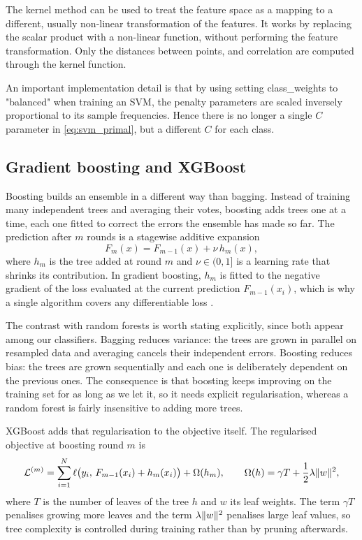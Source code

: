 The kernel method can be used to treat the feature space as a mapping to a different, usually non-linear transformation of the features. It works by replacing the scalar product with a non-linear function, without performing the feature transformation. Only the distances between points, and correlation are computed through the kernel function.

An important implementation detail is that by using setting class\_weights to "balanced" when training an SVM, the penalty parameters are scaled inversely proportional to its sample frequencies. Hence there is no longer a single $C$ parameter in \eqref{eq:svm_primal}, but a different $C$ for each class.

\subsection*{Gradient boosting and XGBoost}

Boosting builds an ensemble in a different way than bagging. Instead of training many
independent trees and averaging their votes, boosting adds trees one at a time, each one
fitted to correct the errors the ensemble has made so far. The prediction after $m$ rounds is
a stagewise additive expansion
\begin{equation}
F_m(x) = F_{m-1}(x) + \nu \, h_m(x),
\label{eq:boosting_additive}
\end{equation}
where $h_m$ is the tree added at round $m$ and $\nu \in (0,1]$ is a learning rate that shrinks
its contribution. In gradient boosting, $h_m$ is fitted to the negative gradient of the loss
evaluated at the current prediction $F_{m-1}(x_i)$, which is why a single algorithm covers any
differentiable loss \cite{hastie2009elements}.

The contrast with random forests is worth stating explicitly, since both appear among our
classifiers. Bagging reduces variance: the trees are grown in parallel on resampled data and
averaging cancels their independent errors. Boosting reduces bias: the trees are grown
sequentially and each one is deliberately dependent on the previous ones. The consequence is
that boosting keeps improving on the training set for as long as we let it, so it needs
explicit regularisation, whereas a random forest is fairly insensitive to adding more trees.

XGBoost adds that regularisation to the objective itself. The regularised objective at
boosting round $m$ is
\begin{equation}
\mathcal{L}^{(m)} = \sum_{i=1}^{N} \ell\big(y_i, \, F_{m-1}(x_i) + h_m(x_i)\big)
                  + \Omega(h_m),
\qquad
\Omega(h) = \gamma T + \frac{1}{2}\lambda \lVert w\rVert^2,
\label{eq:xgb_objective}
\end{equation}
where $T$ is the number of leaves of the tree $h$ and $w$ its leaf weights. The term $\gamma T$
penalises growing more leaves and the term $\lambda \lVert w\rVert^2$ penalises large leaf values, so
tree complexity is controlled during training rather than by pruning afterwards.

